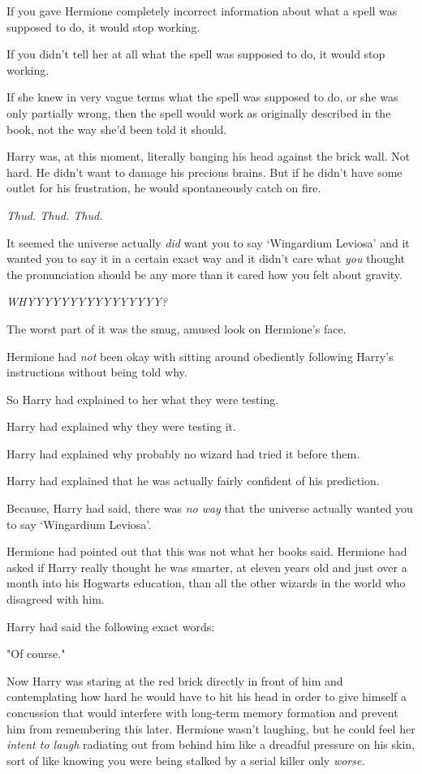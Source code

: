 If you gave Hermione completely incorrect information about what a spell was
supposed to do, it would stop working.

If you didn't tell her at all what the spell was supposed to do, it would stop
working.

If she knew in very vague terms what the spell was supposed to do, or she was
only partially wrong, then the spell would work as originally described in the
book, not the way she'd been told it should.

Harry was, at this moment, literally banging his head against the brick wall.
Not hard. He didn't want to damage his precious brains. But if he didn't have
some outlet for his frustration, he would spontaneously catch on fire.

\emph{Thud. Thud. Thud.}

It seemed the universe actually \emph{did} want you to say `Wingardium Leviosa'
and it wanted you to say it in a certain exact way and it didn't care what
\emph{you} thought the pronunciation should be any more than it cared how you
felt about gravity.

\emph{WHYYYYYYYYYYYYYYYY?}

The worst part of it was the smug, amused look on Hermione's face.

Hermione had \emph{not} been okay with sitting around obediently following
Harry's instructions without being told why.

So Harry had explained to her what they were testing.

Harry had explained why they were testing it.

Harry had explained why probably no wizard had tried it before them.

Harry had explained that he was actually fairly confident of his prediction.

Because, Harry had said, there was \emph{no way} that the universe actually
wanted you to say `Wingardium Leviosa'.

Hermione had pointed out that this was not what her books said. Hermione had
asked if Harry really thought he was smarter, at eleven years old and just over
a month into his Hogwarts education, than all the other wizards in the world
who disagreed with him.

Harry had said the following exact words:

"Of course."

Now Harry was staring at the red brick directly in front of him and
contemplating how hard he would have to hit his head in order to give himself a
concussion that would interfere with long-term memory formation and prevent him
from remembering this later. Hermione wasn't laughing, but he could feel her
\emph{intent to laugh} radiating out from behind him like a dreadful pressure
on his skin, sort of like knowing you were being stalked by a serial killer
only \emph{worse.}

